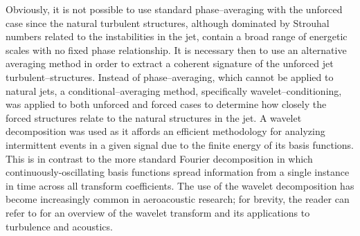 Obviously, it is not possible to use standard phase--averaging with the unforced case since the natural turbulent structures, although dominated by Strouhal numbers related to the instabilities in the jet, contain a broad range of energetic scales with no fixed phase relationship.
It is necessary then to use an alternative averaging method in order to extract a coherent signature of the unforced jet turbulent--structures.
Instead of phase--averaging, which cannot be applied to natural jets, a conditional--averaging method, specifically wavelet--conditioning, was applied to both unforced and forced cases to determine how closely the forced structures relate to the natural structures in the jet.
A wavelet decomposition was used as it affords an efficient methodology for analyzing intermittent events in a given signal due to the finite energy of its basis functions. 
This is in contrast to the more standard Fourier decomposition in which continuously-oscillating basis functions spread information from a single instance in time across all transform coefficients. 
The use of the wavelet decomposition has become increasingly common in aeroacoustic research; for brevity, the reader can refer to \citet{Farge1992} for an overview of the wavelet transform and its applications to turbulence and acoustics.


